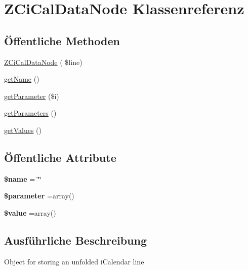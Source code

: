 \hypertarget{class_z_ci_cal_data_node}{}\section{Z\+Ci\+Cal\+Data\+Node Klassenreferenz}
\label{class_z_ci_cal_data_node}
\subsection*{Öffentliche Methoden}
\begin{DoxyCompactItemize}
\item 
\mbox{\hyperlink{class_z_ci_cal_data_node_a9fde88b87dde333e65376b91311459d4}{Z\+Ci\+Cal\+Data\+Node}} ( \$line)
\item 
\mbox{\hyperlink{class_z_ci_cal_data_node_a59d89d4da6a240fa1b7f0b7b6b40c03f}{get\+Name}} ()
\item 
\mbox{\hyperlink{class_z_ci_cal_data_node_a088ae36c738f279ccddcffdca3e0fd9b}{get\+Parameter}} (\$i)
\item 
\mbox{\hyperlink{class_z_ci_cal_data_node_a80e75525c0013a5c13a84e6952828120}{get\+Parameters}} ()
\item 
\mbox{\hyperlink{class_z_ci_cal_data_node_a1c4e81aef52c5ec62a3e562b9216bb11}{get\+Values}} ()
\end{DoxyCompactItemize}
\subsection*{Öffentliche Attribute}
\begin{DoxyCompactItemize}
\item 
\mbox{\label{class_z_ci_cal_data_node_a58a91c6fef8efbd876dea47361647d6d}} 
{\bfseries \$name} = \char`\"{}\char`\"{}
\item 
\mbox{\label{class_z_ci_cal_data_node_a895058be3ba0ac8cf25f11e0fdf97d05}} 
{\bfseries \$parameter} =array()
\item 
\mbox{\label{class_z_ci_cal_data_node_a759ebdaa57e995c7c22a38fcb71deed5}} 
{\bfseries \$value} =array()
\end{DoxyCompactItemize}


\subsection{Ausführliche Beschreibung}
Object for storing an unfolded i\+Calendar line

